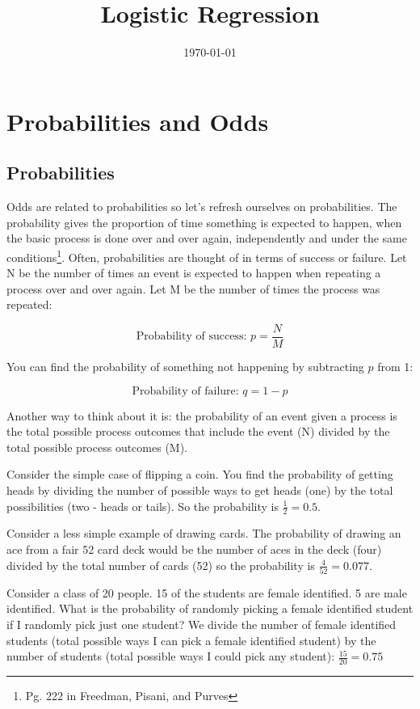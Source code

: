 \documentclass[12pt]{amsart}
\title{Logistic Regression}
\date{\today}                                           %
\begin{document}
\maketitle

\section{Probabilities and Odds}

\subsection{Probabilities}

Odds are related to probabilities so let's refresh ourselves on probabilities. The probability gives the proportion of time something is expected to happen, when the basic process is done over and over again, independently and under the same conditions\footnote{Pg. 222 in Freedman, Pisani, and Purves}. Often, probabilities are thought of in terms of success or failure. Let N be the number of times an event is expected to happen when repeating a process over and over again. Let M be the number of times the process was repeated:

\[ \text{Probability of success: } p = \frac{N}{M} \]

You can find the probability of something not happening by subtracting $p$ from 1:

\[ \text{Probability of failure: } q = 1-p \]

Another way to think about it is: the probability of an event given a process is the total possible process outcomes that include the event (N) divided by the total possible process outcomes (M).

Consider the simple case of flipping a coin. You find the probability of getting heads by dividing the number of possible ways to get heads (one) by the total possibilities (two - heads or tails). So the probability is $\frac{1}{2} = 0.5$.

Consider a less simple example of drawing cards. The probability of drawing an ace from a fair 52 card deck would be the number of aces in the deck (four) divided by the total number of cards (52) so the probability is $\frac{4}{52} = 0.077$.

Consider a class of 20 people. 15 of the students are female identified. 5 are male identified. What is the probability of randomly picking a female identified student if I randomly pick just one student? We divide the number of female identified students (total possible ways I can pick a female identified student) by the number of students (total possible ways I could pick any student): $\frac{15}{20} = 0.75$
\end{document}
